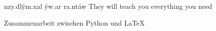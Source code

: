 \begin{figure}
	\exampleentryDK
		{nzy.\-dl\'ym.\-xal \zh{}\'yw.\-ar ra\zh{}.\-nt\'aw}
		{
		}
		{They will teach you everything you need}
	\caption{Zusammenarbeit zwischen Python und \LaTeX}
	\label{fig:olddwarven}
\end{figure}
